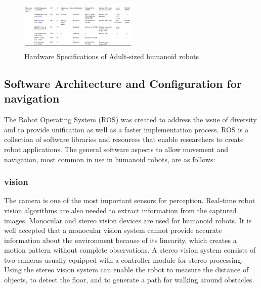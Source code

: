 \documentclass[conference]{IEEEtran}
\begin{document}
\begin{figure}[h]
    \centerline{\includegraphics[width=0.5\textwidth]{prerak_images/Picture9.png}}
    \caption{Hardware Specifications of Adult-sized humanoid robots}
\label{prerakfig7}
\end{figure}

\subsection{Software Architecture and Configuration for navigation}
The Robot Operating System (ROS) was created to address the issue of diversity and to provide unification as well as a faster implementation process\autocite{5saeedvand2019comprehensive}. ROS is a collection of software libraries and resources that enable researchers to create robot applications.
The general software aspects to allow movement and navigation, most common in use in humanoid robots, are as follows:

\subsubsection{vision}
The camera is one of the most important sensors for perception. Real-time robot vision algorithms are also needed to extract information from the captured images. Monocular and stereo vision devices are used for humanoid robots. It is well accepted that a monocular vision system cannot provide accurate information about the environment because of its linearity, which creates a motion pattern without complete observations. A stereo vision system consists of two cameras usually equipped with a controller module for stereo processing. Using the stereo vision system can enable the robot to measure the distance of objects, to detect the floor, and to generate a path for walking around obstacles\autocite{5saeedvand2019comprehensive}.
\end{document}
